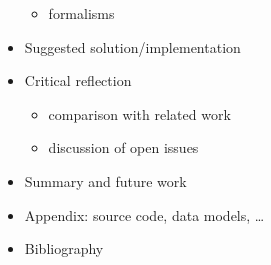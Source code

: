 \begin{itemize}
\begin{itemize}
  		\item formalisms
  	\end{itemize}
  \item Suggested solution/implementation
  \item Critical reflection
  	\begin{itemize}
  		\item comparison with related work
  		\item discussion of open issues
  	\end{itemize}
  \item Summary and future work
  \item Appendix: source code, data models, \dots
  \item Bibliography
\end{itemize}

